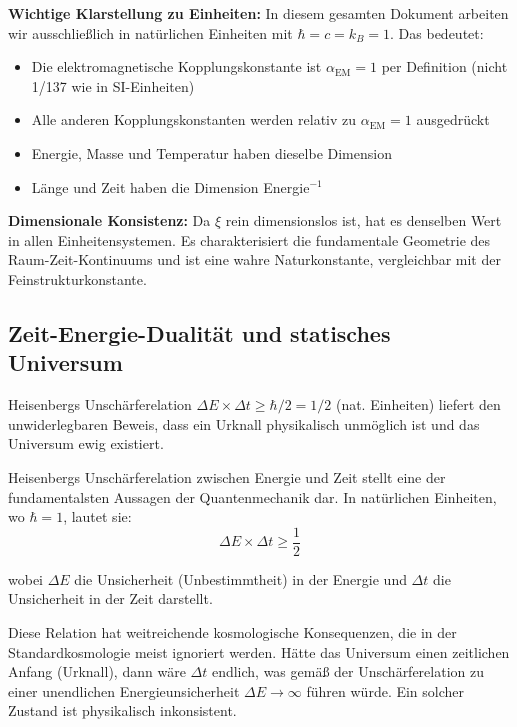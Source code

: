 \documentclass[12pt,a4paper]{article}
\begin{document}
	\textbf{Wichtige Klarstellung zu Einheiten:}
	In diesem gesamten Dokument arbeiten wir ausschließ{}lich in natürlichen Einheiten mit $\hbar = c = k_B = 1$. Das bedeutet:
	\begin{itemize}
		\item Die elektromagnetische Kopplungskonstante ist $\alpha_{\text{EM}} = 1$ per Definition (nicht 1/137 wie in SI-Einheiten)
		\item Alle anderen Kopplungskonstanten werden relativ zu $\alpha_{\text{EM}} = 1$ ausgedrückt
		\item Energie, Masse und Temperatur haben dieselbe Dimension
		\item Länge und Zeit haben die Dimension Energie$^{-1}$
	\end{itemize}
	
	\textbf{Dimensionale Konsistenz:} Da $\xi$ rein dimensionslos ist, hat es denselben Wert in allen Einheitensystemen. Es charakterisiert die fundamentale Geometrie des Raum-Zeit-Kontinuums und ist eine wahre Naturkonstante, vergleichbar mit der Feinstrukturkonstante.
	
	\subsection{Zeit-Energie-Dualität und statisches Universum}
	
	\begin{important}
		Heisenbergs Unschärferelation $\Delta E \times \Delta t \geq \hbar/2 = 1/2$ (nat. Einheiten) liefert den unwiderlegbaren Beweis, dass ein Urknall physikalisch unmöglich ist und das Universum ewig existiert.
	\end{important}
	
	Heisenbergs Unschärferelation zwischen Energie und Zeit stellt eine der fundamentalsten Aussagen der Quantenmechanik dar. In natürlichen Einheiten, wo $\hbar = 1$, lautet sie:
	\begin{equation}
		\Delta E \times \Delta t \geq \frac{1}{2}
	\end{equation}
	
	wobei $\Delta E$ die Unsicherheit (Unbestimmtheit) in der Energie und $\Delta t$ die Unsicherheit in der Zeit darstellt.
	
	Diese Relation hat weitreichende kosmologische Konsequenzen, die in der Standardkosmologie meist ignoriert werden. Hätte das Universum einen zeitlichen Anfang (Urknall), dann wäre $\Delta t$ endlich, was gemäß{} der Unschärferelation zu einer unendlichen Energieunsicherheit $\Delta E \to \infty$ führen würde. Ein solcher Zustand ist physikalisch inkonsistent.
	
\end{document}
